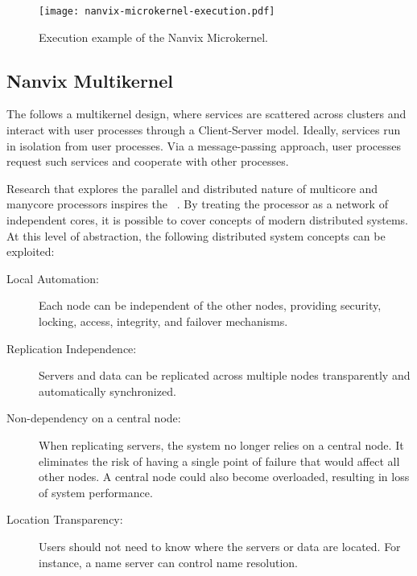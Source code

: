 		\begin{figure}[!tb]
			\centering%
			\caption{Execution example of the Nanvix Microkernel.}%
			\label{fig:microkernel-execution}%
			\texttt{[image: nanvix-microkernel-execution.pdf]}%
		\end{figure}

	\subsection{Nanvix Multikernel}
	\label{sec.multikernel}

		The \nanvix \multikernel follows a multikernel design, where \os services
		are scattered across clusters and interact with user processes through a
		Client-Server model.
		Ideally, \os services run in isolation from user processes.
		Via a message-passing approach, user processes request such services and
		cooperate with other processes.

		Research that explores the parallel and distributed nature of multicore and
		manycore processors inspires the \nanvix \multikernel~\cite{wentzlaff_factored_2009, baumann_multikernel:_2009, Wisniewski2014}.
		By treating the processor as a network of independent cores, it is possible
		to cover concepts of modern distributed systems.
		At this level of abstraction, the following distributed system concepts can be exploited:

		\begin{description}

			\item[Local Automation:] Each node can be independent of the other nodes, providing
				security, locking, access, integrity, and failover mechanisms.

			\item[Replication Independence:] Servers and data can be replicated across multiple
				nodes transparently and automatically synchronized.

			\item[Non-dependency on a central node:] When replicating servers, the system no
				longer relies on a central node.
				It eliminates the risk of having a single point of failure that would affect all other nodes.
				A central node could also become overloaded, resulting in loss of system performance.

			\item[Location Transparency:] Users should not need to know where the servers
				or data are located. For instance, a name server can control name resolution.

		\end{description}

